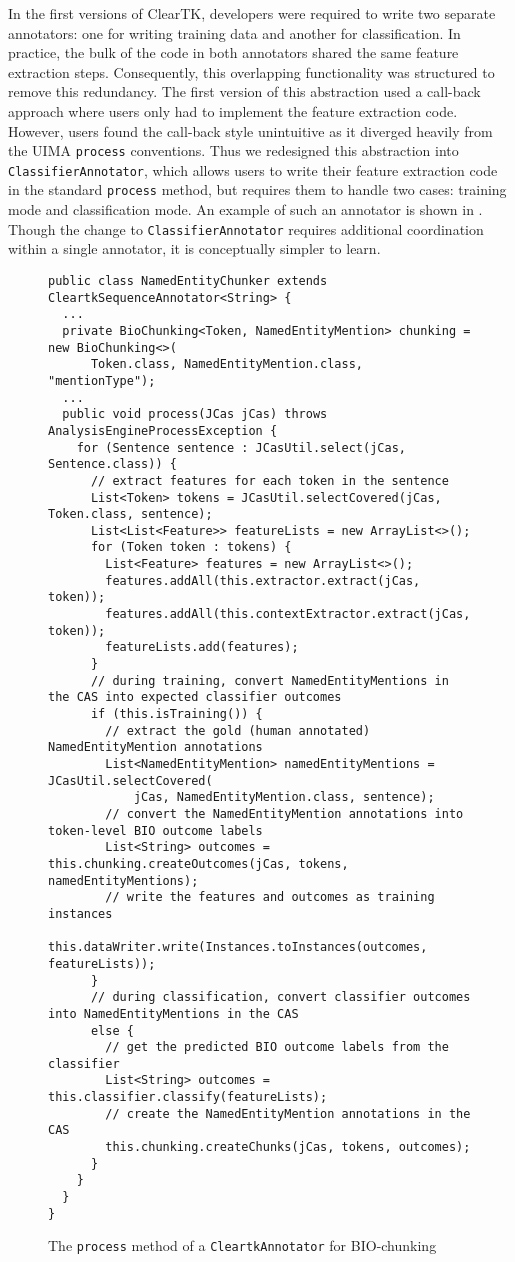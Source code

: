 \documentclass[10pt, a4paper]{article}
\newcommand{\code}[1]{\texttt{\small #1}}
\begin{document}
In the first versions of ClearTK, developers were required to write two separate annotators: one for writing training data and another for classification.  In practice, the bulk of the code in both annotators shared the same feature extraction steps.  Consequently, this overlapping functionality was structured to remove this redundancy.  The first version of this abstraction used a call-back approach where users only had to implement the feature extraction code.  However, users found the call-back style unintuitive as it diverged heavily from the UIMA \code{process} conventions.  
Thus we redesigned this abstraction into \code{ClassifierAnnotator}, which allows users to write their feature extraction code in the standard \code{process} method, but requires them to handle two cases: training mode and classification mode.  
An example of such an annotator is shown in .
Though the change to \code{ClassifierAnnotator} requires additional coordination within a single annotator, it is conceptually simpler to learn.
\begin{figure*}
\begin{lstlisting}
public class NamedEntityChunker extends CleartkSequenceAnnotator<String> {
  ...
  private BioChunking<Token, NamedEntityMention> chunking = new BioChunking<>(
      Token.class, NamedEntityMention.class, "mentionType");
  ...
  public void process(JCas jCas) throws AnalysisEngineProcessException {
    for (Sentence sentence : JCasUtil.select(jCas, Sentence.class)) {
      // extract features for each token in the sentence
      List<Token> tokens = JCasUtil.selectCovered(jCas, Token.class, sentence);
      List<List<Feature>> featureLists = new ArrayList<>();
      for (Token token : tokens) {
        List<Feature> features = new ArrayList<>();
        features.addAll(this.extractor.extract(jCas, token));
        features.addAll(this.contextExtractor.extract(jCas, token));
        featureLists.add(features);
      }
      // during training, convert NamedEntityMentions in the CAS into expected classifier outcomes
      if (this.isTraining()) {
        // extract the gold (human annotated) NamedEntityMention annotations
        List<NamedEntityMention> namedEntityMentions = JCasUtil.selectCovered(
            jCas, NamedEntityMention.class, sentence);
        // convert the NamedEntityMention annotations into token-level BIO outcome labels
        List<String> outcomes = this.chunking.createOutcomes(jCas, tokens, namedEntityMentions);
        // write the features and outcomes as training instances
        this.dataWriter.write(Instances.toInstances(outcomes, featureLists));
      }
      // during classification, convert classifier outcomes into NamedEntityMentions in the CAS
      else {
        // get the predicted BIO outcome labels from the classifier
        List<String> outcomes = this.classifier.classify(featureLists);
        // create the NamedEntityMention annotations in the CAS
        this.chunking.createChunks(jCas, tokens, outcomes);
      }
    }
  }
}
\end{lstlisting}
\caption{The \code{process} method of a \code{CleartkAnnotator} for BIO-chunking}
\label{fig:bio-chunker-code}
\end{figure*}
\end{document}
